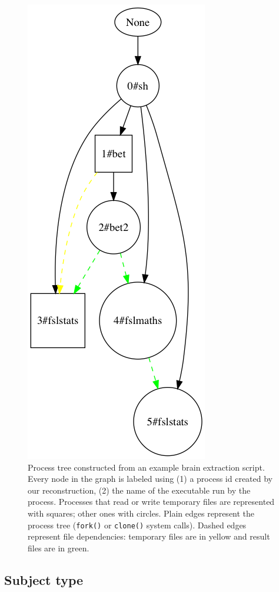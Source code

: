 \documentclass[a4paper,num-refs]{oup-contemporary}
\begin{document}
\begin{figure}
\centering
  \includegraphics[scale=0.25]{images/simple_graph}
  \caption{Process tree constructed from an example brain extraction
	script. Every node in the graph is labeled using (1) a process id 
	created by our reconstruction, (2) the name of the executable run 
	by the process. Processes that read or write temporary files are 
	represented with squares; other ones with circles. Plain edges 
	represent the process tree (\texttt{fork()} or \texttt{clone()} 
	system calls). Dashed edges represent file dependencies: temporary 
	files are in yellow and result files are in green.}
  \label{fig:simple_script}
\end{figure}

\subsection{Subject type}
\end{document}
